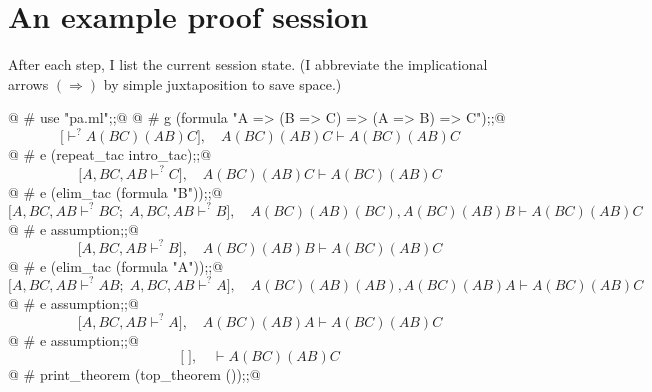 \documentclass[a4paper,11pt]{article} %
\begin{document}
\section{An example proof session}

After each step, I list the current session state. (I abbreviate the implicational arrows $(\Rightarrow)$ by simple juxtaposition to save space.)

@  # use "pa.ml";;@
@  # g (formula "A => (B => C) => (A => B) => C");;@
\begin{equation*}
\big[
  \vdash^? A(BC)(AB)C
\big],\quad
  A(BC)(AB)C \vdash A(BC)(AB)C
\end{equation*}
@  # e (repeat_tac intro_tac);;@
\begin{equation*}
\big[
  A, BC, AB\vdash^? C
\big],\quad
  A(BC)(AB)C \vdash A(BC)(AB)C
\end{equation*}
@  # e (elim_tac (formula "B"));;@
\begin{equation*}
\big[
  A, BC, AB\vdash^? BC;\;
  A, BC, AB\vdash^? B
\big],\quad
  A(BC)(AB)(BC), A(BC)(AB)B \vdash A(BC)(AB)C
\end{equation*}
@  # e assumption;;@
\begin{equation*}
\big[
  A, BC, AB\vdash^? B
\big],\quad
  A(BC)(AB)B \vdash A(BC)(AB)C
\end{equation*}
@  # e (elim_tac (formula "A"));;@
\begin{equation*}
\big[
  A, BC, AB\vdash^? AB;\;
  A, BC, AB\vdash^? A
\big],\quad
  A(BC)(AB)(AB), A(BC)(AB)A \vdash A(BC)(AB)C
\end{equation*}
@  # e assumption;;@
\begin{equation*}
\big[
  A, BC, AB\vdash^? A
\big],\quad
  A(BC)(AB)A \vdash A(BC)(AB)C
\end{equation*}
@  # e assumption;;@
\begin{equation*}
\big[\;
\big],\quad
  \vdash A(BC)(AB)C
\end{equation*}
@  # print_theorem (top_theorem ());;@
\end{document}
